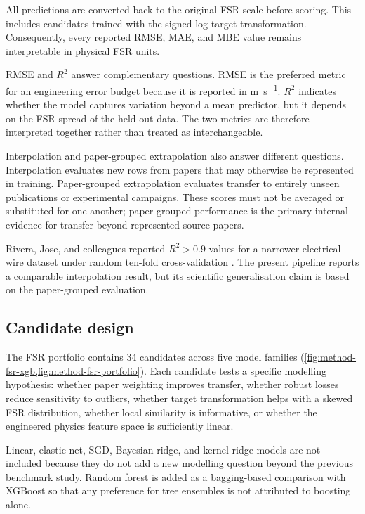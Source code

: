 All predictions are converted back to the original FSR scale before scoring.
This includes candidates trained with the signed-log target transformation.
Consequently, every reported RMSE, MAE, and MBE value remains interpretable in
physical FSR units.

RMSE and \(R^2\) answer complementary questions. RMSE is the preferred metric
for an engineering error budget because it is reported in
\si{\metre\per\second}. \(R^2\) indicates whether the model captures variation
beyond a mean predictor, but it depends on the FSR spread of the held-out data.
The two metrics are therefore interpreted together rather than treated as
interchangeable.

Interpolation and paper-grouped extrapolation also answer different questions.
Interpolation evaluates new rows from papers that may otherwise be represented
in training. Paper-grouped extrapolation evaluates transfer to entirely unseen
publications or experimental campaigns. These scores must not be averaged or
substituted for one another; paper-grouped performance is the primary internal
evidence for transfer beyond represented source papers.

Rivera, Jose, and colleagues reported \(R^2>0.9\) values for a narrower
electrical-wire dataset under random ten-fold cross-validation
\cite{riveraWireML}. The present pipeline reports a comparable interpolation
result, but its scientific generalisation claim is based on the paper-grouped
evaluation.

\subsection{Candidate design}

The FSR portfolio contains 34 candidates across five model families
(\cref{fig:method-fsr-xgb,fig:method-fsr-portfolio}). Each candidate tests a
specific modelling hypothesis: whether paper weighting improves transfer,
whether robust losses reduce sensitivity to outliers, whether target
transformation helps with a skewed FSR distribution, whether local similarity
is informative, or whether the engineered physics feature space is sufficiently
linear.

Linear, elastic-net, SGD, Bayesian-ridge, and kernel-ridge models are not
included because they do not add a new modelling question beyond the previous
benchmark study. Random forest is added as a bagging-based comparison with
XGBoost so that any preference for tree ensembles is not attributed to
boosting alone.


